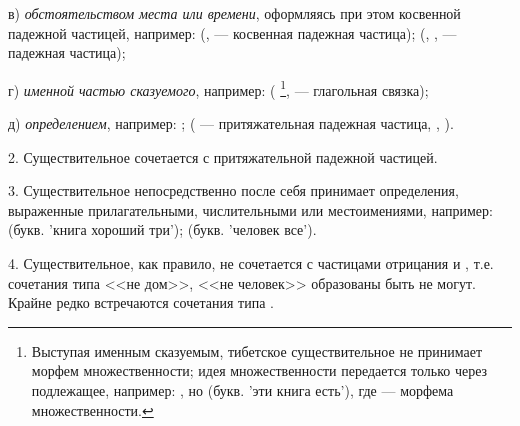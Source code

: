 в) \emph{обстоятельством места или времени}, оформляясь при этом косвенной падежной частицей, например:
 (, 
 --- косвенная падежная частица);
(, ,  --- падежная частица);

г) \emph{именной частью сказуемого}, например:
(
\footnote[26]{
Выступая именным сказуемым, тибетское существительное не принимает морфем множественности; идея множественности передается только через подлежащее, например: , но
(букв. 'эти книга есть'), где  --- морфема множественности.
},
 --- глагольная связка);

д) \emph{определением}, например:
;
( --- притяжательная падежная частица, ,
).

2. Существительное сочетается с притяжательной падежной частицей.

3. Существительное непосредственно после себя принимает определения, выраженные прилагательными, числительными или местоимениями, например:
 (букв. 'книга хороший три');
 (букв. 'человек все').

4. Существительное, как правило, не сочетается с частицами отрицания  и , т.е. сочетания типа <<не дом>>, <<не человек>> образованы быть не могут. Крайне редко встречаются сочетания типа	.